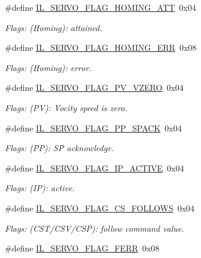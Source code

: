 \begin{DoxyCompactItemize}
\#define \hyperlink{group__IL__SERVO_ga683ef09e3c3e8133cfe1332a067cb88a}{I\+L\+\_\+\+S\+E\+R\+V\+O\+\_\+\+F\+L\+A\+G\+\_\+\+H\+O\+M\+I\+N\+G\+\_\+\+A\+TT}~0x04
\begin{DoxyCompactList}\small\item\em Flags\+: (Homing)\+: attained. \end{DoxyCompactList}\item 
\#define \hyperlink{group__IL__SERVO_gaa8b47a602774d828155efbc452bfbe66}{I\+L\+\_\+\+S\+E\+R\+V\+O\+\_\+\+F\+L\+A\+G\+\_\+\+H\+O\+M\+I\+N\+G\+\_\+\+E\+RR}~0x08
\begin{DoxyCompactList}\small\item\em Flags\+: (Homing)\+: error. \end{DoxyCompactList}\item 
\#define \hyperlink{group__IL__SERVO_gafa091abecc943d2133cd2a11bf1e6581}{I\+L\+\_\+\+S\+E\+R\+V\+O\+\_\+\+F\+L\+A\+G\+\_\+\+P\+V\+\_\+\+V\+Z\+E\+RO}~0x04
\begin{DoxyCompactList}\small\item\em Flags\+: (PV)\+: Vocity speed is zero. \end{DoxyCompactList}\item 
\#define \hyperlink{group__IL__SERVO_ga41e25c02b8b67f9d845f970cd6870144}{I\+L\+\_\+\+S\+E\+R\+V\+O\+\_\+\+F\+L\+A\+G\+\_\+\+P\+P\+\_\+\+S\+P\+A\+CK}~0x04
\begin{DoxyCompactList}\small\item\em Flags\+: (PP)\+: SP acknowledge. \end{DoxyCompactList}\item 
\#define \hyperlink{group__IL__SERVO_ga13208d747f34c53249e4e806dc1e88b9}{I\+L\+\_\+\+S\+E\+R\+V\+O\+\_\+\+F\+L\+A\+G\+\_\+\+I\+P\+\_\+\+A\+C\+T\+I\+VE}~0x04
\begin{DoxyCompactList}\small\item\em Flags\+: (IP)\+: active. \end{DoxyCompactList}\item 
\#define \hyperlink{group__IL__SERVO_gad862ccc1fcb5ee2969898185b2e8e10c}{I\+L\+\_\+\+S\+E\+R\+V\+O\+\_\+\+F\+L\+A\+G\+\_\+\+C\+S\+\_\+\+F\+O\+L\+L\+O\+WS}~0x04
\begin{DoxyCompactList}\small\item\em Flags\+: (C\+S\+T/\+C\+S\+V/\+C\+SP)\+: follow command value. \end{DoxyCompactList}\item 
\#define \hyperlink{group__IL__SERVO_gaa782f00113ceb5b0582471b8fe86a628}{I\+L\+\_\+\+S\+E\+R\+V\+O\+\_\+\+F\+L\+A\+G\+\_\+\+F\+E\+RR}~0x08

\end{DoxyCompactItemize}
